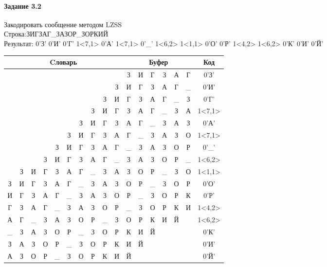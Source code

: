 \documentclass[a4paper, 12pt]{article}
\begin{document}
\paragraph{Задание 3.2}

Закодировать сообщение методом LZSS\\
Строка:ЗИГЗАГ\_ЗАЗОР\_ЗОРКИЙ\\
Результат: 0'З' 0'И' 0'Г' 1<7,1> 0'А' 1<7,1> 0'\_' 1<6,2> 1<1,1> 0'О' 0'Р' 1<4,2> 1<6,2> 0'К' 0'И' 0'Й'\\
\begin{table}[h!]
\centering
\begin{tabular}{|c|c|c|c|c|c|c|c|c|c|c|c|c|c|c|c|c|}
\hline
\multicolumn{10}{|c|}{Cловарь} & \multicolumn{6}{c|}{Буфер} & Код  \\ \hline
  &   &   &   &   &   &   &   &   &   & З & И & Г & З & А & Г & 0'З'\\ \hline
  &   &   &   &   &   &   &   &   & З & И & Г & З & А & Г & \_ & 0'И'\\ \hline
  &   &   &   &   &   &   &   & З & И & Г & З & А & Г & \_ & З & 0'Г'\\ \hline
  &   &   &   &   &   &   & \cellcolor[HTML]{FFFF00} З & И & Г & \cellcolor[HTML]{FFFF00} З & А & Г & \_ & З & А & 1<7,1>\\ \hline
  &   &   &   &   &   & З & И & Г & З & А & Г & \_ & З & А & З & 0'А'\\ \hline
  &   &   &   &   & З & И & \cellcolor[HTML]{FFFF00} Г & З & А & \cellcolor[HTML]{FFFF00} Г & \_ & З & А & З & О & 1<7,1>\\ \hline
  &   &   &   & З & И & Г & З & А & Г & \_ & З & А & З & О & Р & 0'\_'\\ \hline
  &   &   & З & И & Г & \cellcolor[HTML]{FFFF00} З & \cellcolor[HTML]{FFFF00} А & Г & \_ & \cellcolor[HTML]{FFFF00} З & \cellcolor[HTML]{FFFF00} А & З & О & Р & \_ & 1<6,2>\\ \hline
  & \cellcolor[HTML]{FFFF00} З & И & Г & З & А & Г & \_ & З & А & \cellcolor[HTML]{FFFF00} З & О & Р & \_ & З & О & 1<1,1>\\ \hline
З & И & Г & З & А & Г & \_ & З & А & З & О & Р & \_ & З & О & Р & 0'О'\\ \hline
И & Г & З & А & Г & \_ & З & А & З & О & Р & \_ & З & О & Р & К & 0'Р'\\ \hline
Г & З & А & Г & \cellcolor[HTML]{FFFF00} \_ & \cellcolor[HTML]{FFFF00} З & А & З & О & Р & \cellcolor[HTML]{FFFF00} \_ & \cellcolor[HTML]{FFFF00} З & О & Р & К & И & 1<4,2>\\ \hline
А & Г & \_ & З & А & З & \cellcolor[HTML]{FFFF00} О & \cellcolor[HTML]{FFFF00} Р & \_ & З & \cellcolor[HTML]{FFFF00} О & \cellcolor[HTML]{FFFF00} Р & К & И & Й &   & 1<6,2>\\ \hline
\_ & З & А & З & О & Р & \_ & З & О & Р & К & И & Й &   &   &   & 0'К'\\ \hline
З & А & З & О & Р & \_ & З & О & Р & К & И & Й &   &   &   &   & 0'И'\\ \hline
А & З & О & Р & \_ & З & О & Р & К & И & Й &   &   &   &   &   & 0'Й'\\ \hline
\end{tabular}
\end{table}
\end{document}
